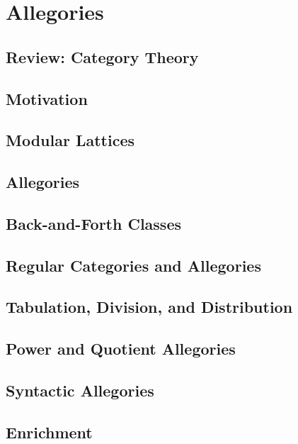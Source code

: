 \documentclass[11pt]{book}
\begin{document}
\chapter{Allegories}

\section*{Review: Category Theory}

\section{Motivation}

\section{Modular Lattices}

\section{Allegories}

\section{Back-and-Forth Classes}

\section{Regular Categories and Allegories}

\section{Tabulation, Division, and Distribution}

\section{Power and Quotient Allegories}

\section{Syntactic Allegories}

\section{Enrichment}
\end{document}
